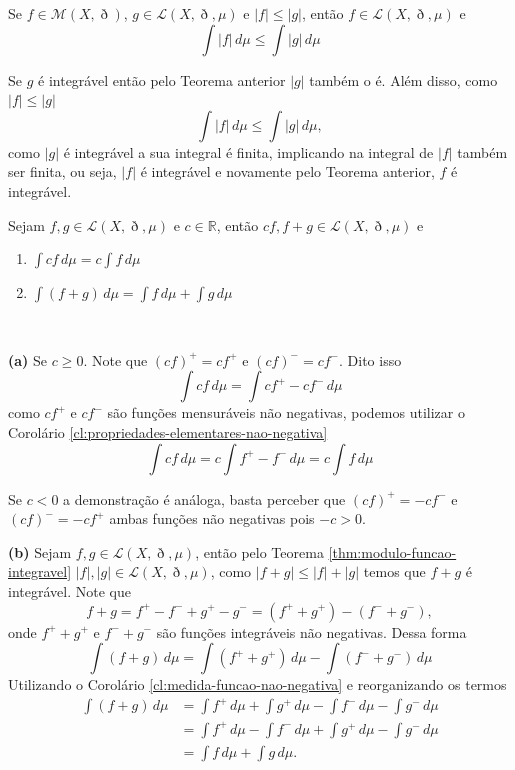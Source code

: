 \documentclass[a4paper, 11pt]{book}
\theoremstyle{definition}
\newcommand{\bR}{\mathbb{R}}
\newcommand{\cM}{\mathcal{M}}
\newcommand{\cL}{\mathcal{L}}
\begin{document}
\begin{cbox} \label{cl:g-implica-f-integravel}
    Se $f \in \cM(X,\eth)$, $g \in \cL(X,\eth,\mu)$ e $|f| \leqslant |g|$, então $f \in \cL(X,\eth,\mu)$ e 
    \[
        \int |f| \,d\mu \leqslant \int |g| \,d\mu
    \]
\end{cbox}
\begin{prf}
    Se $g$ é integrável então pelo Teorema anterior $|g|$ também o é.
    Além disso, como $|f| \leqslant |g|$
    \[
        \int |f| \,d\mu \leqslant \int |g| \,d\mu,
    \]
    como $|g|$ é integrável a sua integral é finita, implicando na integral de $|f|$ também ser finita, ou seja, $|f|$ é integrável e novamente pelo Teorema anterior, $f$ é integrável.
\end{prf}

\begin{tbox} \label{thm:operacoes-elementares-integral}
    Sejam $f, g \in \cL(X,\eth,\mu)$ e $c \in \bR$, então $cf, f + g \in \cL(X,\eth,\mu)$ e 
    \begin{enumerate}[leftmargin=*, label=\textbf{(\alph*)}]
        \item $\displaystyle \int cf \, d\mu = c \int f \,d \mu$
        \item $\displaystyle \int (f + g) \, d\mu = \int f \,d \mu + \int g \, d\mu$
    \end{enumerate}
\end{tbox}
\begin{prf}
    ~

    \textbf{(a)} Se $c \geqslant 0$.
    Note que $(cf)^+ = c f^+$ e $(cf)^- = cf^-$. Dito isso
    \[
        \int cf \,d\mu = \int cf^+ - cf^- \,d\mu 
    \]
    como $cf^+$ e $cf^-$ são funções mensuráveis não negativas, podemos utilizar o Corolário \ref{cl:propriedades-elementares-nao-negativa}
    \[
        \int cf \,d\mu =  c \int f^+ - f^- \,d\mu = c \int f\,d\mu
    \]

    Se $c < 0$ a demonstração é análoga, basta perceber que $(cf)^+ = -c f^-$ e $(cf)^- = -cf^+$ ambas funções não negativas pois $-c > 0$.

    \textbf{(b)} Sejam $f, g \in \cL(X,\eth,\mu)$, então pelo Teorema \ref{thm:modulo-funcao-integravel} $|f|, |g| \in \cL(X,\eth,\mu)$, como $| f + g| \leqslant |f| + |g|$ temos que $f + g$ é integrável. Note que
    \[
        f + g = f^+ - f^- + g^+ - g^- = (f^+ + g^+) - (f^- + g^-),
    \]
    onde $f^+ + g^+$ e $f^- + g^-$ são funções integráveis não negativas. Dessa forma
    \[
        \int (f + g)\,d\mu = \int (f^+ + g^+)\,d\mu - \int (f^- + g^-)\,d\mu
    \]
    Utilizando o Corolário \ref{cl:medida-funcao-nao-negativa} e reorganizando os termos
    \[
        \begin{aligned}
            \int (f + g)\,d\mu &= \int f^+ \,d\mu + \int g^+\,d\mu - \int f^- \,d\mu  -\int g^-\,d\mu\\
            &= \int f^+ \,d\mu  - \int f^- \,d\mu + \int g^+ \,d\mu  - \int g^- \,d\mu\\
            &= \int f \,d\mu + \int g \,d\mu.
        \end{aligned}
    \] 
\end{prf}
\end{document}
